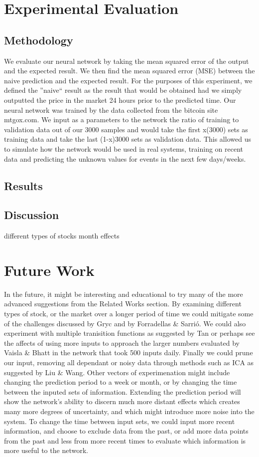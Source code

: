 \documentclass[a4paper,11pt]{article}
\begin{document}
\section{Experimental Evaluation}
\subsection{Methodology}
We evaluate our neural network by taking the mean squared error of the output and the expected result. We then find the mean squared error (MSE) between the naive prediction and the expected result. For the purposes of this experiment, we defined the ''naive`` result as the result that would be obtained had we simply outputted the price in the market 24 hours prior to the predicted time. 
Our neural network was trained by the data collected from the bitcoin site mtgox.com. We input as a parameters to the network the ratio of training to validation data out of our 3000 samples and would take the first x(3000) sets as training data and take the last (1-x)3000 sets as validation data. This allowed us to simulate  how the network would be used in real systems, training on recent data and predicting the unknown values for events in the next few days/weeks. 
\subsection{Results}
\subsection{Discussion}
different types of stocks
month effects


\section{Future Work}

In the future, it might be interesting and educational to try many of the more advanced suggestions from the Related Works section. By examining different types of stock, or the market over a longer period of time we could mitigate some of the challenges discussed by Gryc and  by Forradellas \& Sarrió. We could also experiment with multiple tranisition functions as suggested by Tan or perhaps see the affects of using more inputs to approach the larger numbers evaluated by Vaisla \& Bhatt in the network that took 500 inputs daily. Finally we could prune our input, removing all dependant or noisy data through methods such as ICA as suggested by Liu \& Wang. Other vectors of experimenation might include changing the prediction period to a week or month, or by changing the time between the inputed sets of information. Extending the prediction period will show the network's ability to discern much more distant effects which creates many more degrees of uncertainty, and which might introduce more noise into the 
system. To change the time between input sets, we could input more recent information, and choose to exclude data from the past, or add more data points from the past and less from more recent times to evaluate which information is more useful to the network.
\end{document}
